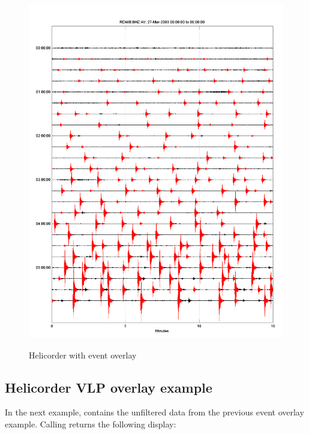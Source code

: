 \documentclass[11pt]{article}
\begin{document}
\begin{figure}[ht] 
\centerline{\scalebox{.6} {\includegraphics{hel_e_sst.png}}} 
\caption{Helicorder with event overlay} 
\label{hel_e_sst}
\end{figure}

\clearpage

\subsection{Helicorder VLP overlay example}

In the next example,  contains the unfiltered data from the previous event overlay example. Calling  returns the following display:
\end{document}
